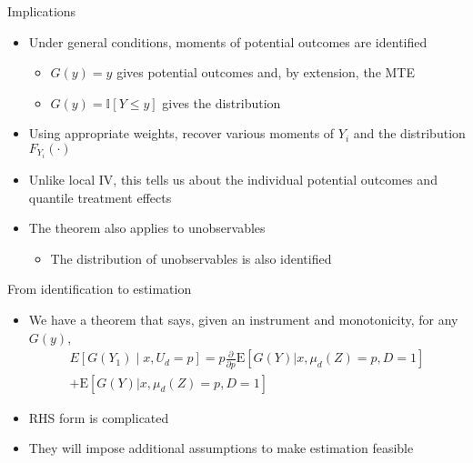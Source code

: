 \documentclass{beamer}
\newcommand{\E}{\mathrm{E}} %
\begin{document}
\begin{frame}{Implications}

\begin{itemize}

\item Under general conditions, moments of potential outcomes are
  identified
\begin{itemize}
\item $G(y) = y$ gives potential outcomes and, by extension, the MTE

\item $G(y) = \mathbb{I} \left[ Y \leq y \right]$ gives the
  distribution
\end{itemize}

\pause

\item Using appropriate weights, recover various moments of $Y_i$ and
  the distribution $F_{Y_i}(\cdot)$

\item Unlike local IV, this tells us about the individual potential
  outcomes and quantile treatment effects

\pause

\item The theorem also applies to unobservables
\begin{itemize}
\item The distribution of unobservables is also identified
\end{itemize}

\end{itemize}

\end{frame}


\begin{frame}{From identification to estimation}
  \begin{itemize}
  \item We have a theorem that says, given an instrument and monotonicity, for any $G(y)$,
    \begin{align*}
      E[G(Y_1)\mid x, U_d=p] =   p \frac{\partial}{\partial p} \E\left[ G(Y) |  x, \mu_d(Z) = p, D = 1 \right] \\+  \E \left[ G(Y) | x, \mu_d(Z) = p, D = 1 \right] 
    \end{align*}
  \item RHS form is complicated
    \item They will impose additional assumptions to make estimation feasible
  \end{itemize}


\end{frame}
\end{document}
